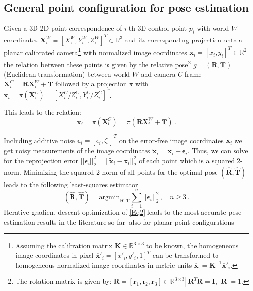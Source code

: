 \documentclass[letterpaper, 10 pt, conference]{ieeeconf}  %
\begin{document}
	\subsection{General point configuration for pose estimation}
	
	Given a 3D-2D point correspondence of $i$-th 3D control point $p_i$ with world $W$ coordinates 
	$\mathbf{X}_i^{W} = [X_i^{W}, Y_i^{W}, Z_i^{W}]^T \in \mathbb{R}^3$ and its corresponding projection onto a planar calibrated camera\footnote{Assuming the calibration matrix $\mathbf{K} \in \mathbb{R}^{3\times 3}$ to be known, the homogeneous image coordinates in pixel 
		$\overline{\mathbf{x}}'_i = [x'_i, y'_i, 1]^T$ can be transformed to homogeneous normalized image coordinates in metric units 
		$\overline{\mathbf{x}}_i = \mathbf{K}^{-1}\overline{\mathbf{x}}'_i$.} with normalized image coordinates $\mathbf{x}_i = [x_i, y_i]^T \in \mathbb{R}^2$ the relation between these points is given by the relative pose\footnote{The rotation matrix is given by: $\mathbf{R} = [\mathbf{r}_1, \mathbf{r}_2, \mathbf{r}_3] \in \mathbb{R}^{3 \times 3} |\,  \mathbf{R}^T\mathbf{R} = \mathbf{I},\, |\mathbf{R}|=1.$ } 
	$g = (\mathbf{R}, \mathbf{T})$ (Euclidean transformation) between world $W$ and camera $C$ frame $\mathbf{X}_i^{C} = \mathbf{R}\mathbf{X}_i^{W}+\mathbf{T}$
	followed by a projection $\pi$ with $\mathbf{x}_i = \pi(\mathbf{X}_i^{C}) = [X_i^{C}/Z_i^{C}, Y_i^{C}/Z_i^{C}]^T$.
	
	This leads to the relation:
	\begin{equation}
	\label{Eq1}
	\mathbf{x}_i = \pi(\mathbf{X}_i^{C}) = \pi(\mathbf{R}\mathbf{X}_i^{W}+\mathbf{T})\,.
	\end{equation}
	
	Including additive noise $\bm{\epsilon}_i = [\epsilon_i, \zeta_i]^T$ on the error-free image coordinates $\mathbf{x}_i$ we get noisy measurements of the image coordinates
	$\tilde{\mathbf{x}}_i = \mathbf{x}_i + \bm{\epsilon}_i$.
	Thus, we can solve for the reprojection error $|\!|\bm{\epsilon}_i|\!|_2^2 = |\!|\tilde{\mathbf{x}}_i - \mathbf{x}_i|\!|_2^2$ of each point
	which is a squared 2-norm. Minimizing the squared 2-norm of all points for the optimal pose $(\hat{\mathbf{R}}, \hat{\mathbf{T}})$ leads to the following least-squares estimator
	\begin{equation}
	\label{Eq2}
	(\hat{\mathbf{R}}, \hat{\mathbf{T}}) = \text{argmin}_{\mathbf{R}, \mathbf{T}} 
	\sum\limits_{i=1}^n |\!|\bm{\epsilon}_i|\!|_2^2\, , \quad n \geq 3 \,.
	\end{equation}
	Iterative gradient descent optimization of \eqref{Eq2} leads to the most accurate pose estimation results in the literature so far,
	also for planar point configurations.
	
\end{document}
